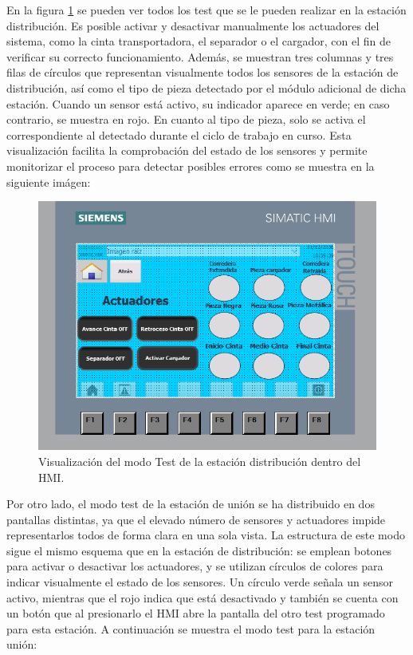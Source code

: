 En la figura \ref{fig:HMI_test_distribucion} se pueden ver todos los test que se le pueden realizar en la estación distribución. Es posible activar y desactivar manualmente los actuadores del sistema, como la cinta transportadora, el separador o el cargador, con el fin de verificar su correcto funcionamiento. Además, se muestran tres columnas y tres filas de círculos que representan visualmente todos los sensores de la estación de distribución, así como el tipo de pieza detectado por el módulo adicional de dicha estación. Cuando un sensor está activo, su indicador aparece en verde; en caso contrario, se muestra en rojo. En cuanto al tipo de pieza, solo se activa el correspondiente al detectado durante el ciclo de trabajo en curso. Esta visualización facilita la comprobación del estado de los sensores y permite monitorizar el proceso para detectar posibles errores como se muestra en la siguiente imágen: 

\begin{figure}[h!]
  \begin{center}
  	\includegraphics[width=12cm]{figs/HMI_test_distribucion}
  \end{center}
  \caption{\centering Visualización del modo Test de la estación distribución dentro del HMI.}
  \label{fig:HMI_test_distribucion}
\end{figure}

Por otro lado, el modo test de la estación de unión se ha distribuido en dos pantallas distintas, ya que el elevado número de sensores y actuadores impide representarlos todos de forma clara en una sola vista. La estructura de este modo sigue el mismo esquema que en la estación de distribución: se emplean botones para activar o desactivar los actuadores, y se utilizan círculos de colores para indicar visualmente el estado de los sensores. Un círculo verde señala un sensor activo, mientras que el rojo indica que está desactivado y también se cuenta con un botón que al presionarlo el HMI abre la pantalla del otro test programado para esta estación. A continuación se muestra el modo test para la estación unión:

